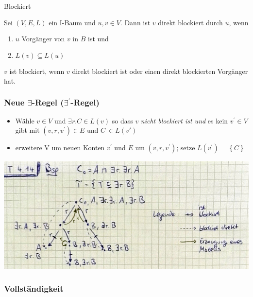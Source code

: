 \begin{definition}{Blockiert}

Sei $\left( V,E,L \right)$ ein I-Baum und $u,v \in V$. Dann ist
$v$ direkt blockiert durch $u$, wenn

\begin{enumerate}
\def\labelenumi{\arabic{enumi}.}
\item
  $u$ Vorgänger von $v$ in $B$ ist und
\item
  $L\left( v \right) \subseteq L\left( u \right)$
\end{enumerate}

$v$ ist blockiert, wenn $v$ direkt blockiert ist oder einen direkt
blockierten Vorgänger hat.
\end{definition}

\subsubsection{\texorpdfstring{Neue $\exists$-Regel
($\exists^{'}$-Regel)}{Neue \textbackslash{}exists-Regel (\textbackslash{}exists\^{}\{'\}-Regel)}}\label{neue-exists-regel-exists-regel}

\begin{itemize}
\item
  Wähle $v \in V$ und $\exists r.C \in L\left( v \right)$ so dass
  $v$ \emph{nicht blockiert ist und} es kein $v^{'} \in V$ gibt mit
  $\left( v,r,v^{'} \right) \in E$ und $C\  \in L\left( v' \right)$
\item
  erweitere V um neuen Konten $v^{'}$ und $E$ um
  $\left( v,r,v^{'} \right)$; setze
  $L\left( v^{'} \right) = \left\{ C \right\}$
\end{itemize}

\includegraphics[width=5.71910in,height=2.33200in]{media/414block.png}

\subsubsection{Vollständigkeit}\label{vollstuxe4ndigkeit}

